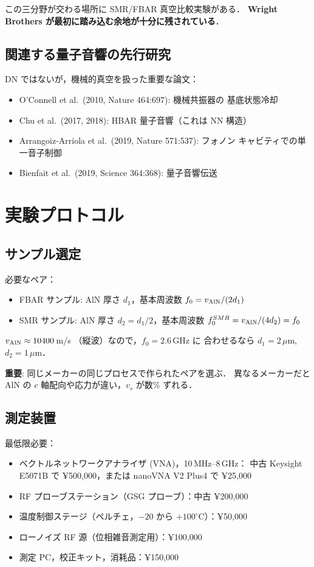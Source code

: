 \documentclass[11pt,a4paper]{article}
\begin{document}
この三分野が交わる場所に SMR/FBAR 真空比較実験がある．
\textbf{Wright Brothers が最初に踏み込む余地が十分に残されている}．

\subsection{関連する量子音響の先行研究}

DN ではないが，機械的真空を扱った重要な論文：

\begin{itemize}
\item O'Connell et al.\ (2010, Nature 464:697): 機械共振器の
基底状態冷却
\item Chu et al.\ (2017, 2018): HBAR 量子音響（これは NN 構造）
\item Arrangoiz-Arriola et al.\ (2019, Nature 571:537): フォノン
キャビティでの単一音子制御
\item Bienfait et al.\ (2019, Science 364:368): 量子音響伝送
\end{itemize}

\section{実験プロトコル}

\subsection{サンプル選定}

必要なペア：
\begin{itemize}
\item FBAR サンプル: AlN 厚さ $d_1$，基本周波数 $f_0 = v_{\rm AlN}/(2 d_1)$
\item SMR サンプル: AlN 厚さ $d_2 = d_1/2$，基本周波数 $f_0^{SMR} = v_{\rm AlN}/(4 d_2) = f_0$
\end{itemize}

$v_{\rm AlN} \approx 10400$\,m/s （縦波）なので，$f_0 = 2.6$\,GHz に
合わせるなら $d_1 = 2\,\mu$m, $d_2 = 1\,\mu$m．

\textbf{重要}: 同じメーカーの同じプロセスで作られたペアを選ぶ．
異なるメーカーだと AlN の $c$ 軸配向や応力が違い，$v_s$ が数\% ずれる．

\subsection{測定装置}

最低限必要：
\begin{itemize}
\item ベクトルネットワークアナライザ (VNA)，10\,MHz--8\,GHz：
中古 Keysight E5071B で ¥500,000，または nanoVNA V2 Plus4 で ¥25,000
\item RF プローブステーション（GSG プローブ）：中古 ¥200,000
\item 温度制御ステージ（ペルチェ，$-20$ から $+100^\circ$C）：¥50,000
\item ローノイズ RF 源（位相雑音測定用）：¥100,000
\item 測定 PC，校正キット，消耗品：¥150,000
\end{itemize}
\end{document}
